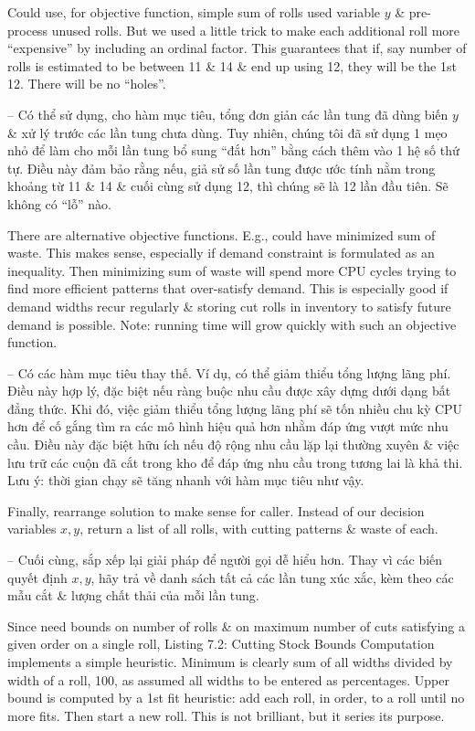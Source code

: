 \documentclass{article}
\begin{document}
\begin{itemize}
\begin{itemize}
\begin{itemize}
\begin{itemize}
                Could use, for objective function, simple sum of rolls used variable $y$ \& pre-process unused rolls. But we used a little trick to make each additional roll more ``expensive'' by including an ordinal factor. This guarantees that if, say number of rolls is estimated to be between 11 \& 14 \& end up using 12, they will be the 1st 12. There will be no ``holes''.

                -- Có thể sử dụng, cho hàm mục tiêu, tổng đơn giản các lần tung đã dùng biến $y$ \& xử lý trước các lần tung chưa dùng. Tuy nhiên, chúng tôi đã sử dụng 1 mẹo nhỏ để làm cho mỗi lần tung bổ sung ``đắt hơn'' bằng cách thêm vào 1 hệ số thứ tự. Điều này đảm bảo rằng nếu, giả sử số lần tung được ước tính nằm trong khoảng từ 11 \& 14 \& cuối cùng sử dụng 12, thì chúng sẽ là 12 lần đầu tiên. Sẽ không có ``lỗ'' nào.

                There are alternative objective functions. E.g., could have minimized sum of waste. This makes sense, especially if demand constraint is formulated as an inequality. Then minimizing sum of waste will spend more CPU cycles trying to find more efficient patterns that over-satisfy demand. This is especially good if demand widths recur regularly \& storing cut rolls in inventory to satisfy future demand is possible. Note: running time will grow quickly with such an objective function.

                -- Có các hàm mục tiêu thay thế. Ví dụ, có thể giảm thiểu tổng lượng lãng phí. Điều này hợp lý, đặc biệt nếu ràng buộc nhu cầu được xây dựng dưới dạng bất đẳng thức. Khi đó, việc giảm thiểu tổng lượng lãng phí sẽ tốn nhiều chu kỳ CPU hơn để cố gắng tìm ra các mô hình hiệu quả hơn nhằm đáp ứng vượt mức nhu cầu. Điều này đặc biệt hữu ích nếu độ rộng nhu cầu lặp lại thường xuyên \& việc lưu trữ các cuộn đã cắt trong kho để đáp ứng nhu cầu trong tương lai là khả thi. Lưu ý: thời gian chạy sẽ tăng nhanh với hàm mục tiêu như vậy.

                Finally, rearrange solution to make sense for caller. Instead of our decision variables $x,y$, return a list of all rolls, with cutting patterns \& waste of each.

                -- Cuối cùng, sắp xếp lại giải pháp để người gọi dễ hiểu hơn. Thay vì các biến quyết định $x,y$, hãy trả về danh sách tất cả các lần tung xúc xắc, kèm theo các mẫu cắt \& lượng chất thải của mỗi lần tung.

                Since need bounds on number of rolls \& on maximum number of cuts satisfying a given order on a single roll, {\sf Listing 7.2: Cutting Stock Bounds Computation} implements a simple heuristic. Minimum is clearly sum of all widths divided by width of a roll, 100, as assumed all widths to be entered as percentages. Upper bound is computed by a 1st fit heuristic: add each roll, in order, to a roll until no more fits. Then start a new roll. This is not brilliant, but it series its purpose.


\end{itemize}
\end{itemize}
\end{itemize}
\end{itemize}
\end{document}
